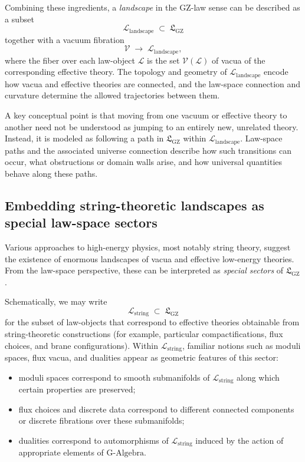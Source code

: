 \documentclass[11pt]{book}
\newcommand{\GAlgebra}{\text{G-Algebra}}
\newcommand{\GZLS}{\ensuremath{\mathfrak{L}_{\mathrm{GZ}}}}
\theoremstyle{plain}
\theoremstyle{definition}
\theoremstyle{remark}
\begin{document}
Combining these ingredients, a \emph{landscape} in the GZ-law sense
can be described as a subset
\[
   \mathcal{L}_{\mathrm{landscape}} \;\subset\; \GZLS
\]
together with a vacuum fibration
\[
   \mathcal{V} \;\longrightarrow\;
   \mathcal{L}_{\mathrm{landscape}},
\]
where the fiber over each law-object $\mathcal{L}$ is the set
$\mathcal{V}(\mathcal{L})$ of vacua of the corresponding effective
theory. The topology and geometry of
$\mathcal{L}_{\mathrm{landscape}}$ encode how vacua and effective
theories are connected, and the law-space connection and curvature
determine the allowed trajectories between them.

A key conceptual point is that moving from one vacuum or effective
theory to another need not be understood as jumping to an entirely
new, unrelated theory. Instead, it is modeled as following a path
in $\GZLS$ within $\mathcal{L}_{\mathrm{landscape}}$. Law-space
paths and the associated universe connection describe how such
transitions can occur, what obstructions or domain walls arise, and
how universal quantities behave along these paths.

\subsection{Embedding string-theoretic landscapes as special law-space sectors}
\label{subsec:string-landscape-sector}


Various approaches to high-energy physics, most notably string
theory, suggest the existence of enormous landscapes of vacua and
effective low-energy theories. From the law-space perspective,
these can be interpreted as \emph{special sectors} of $\GZLS$.

Schematically, we may write
\[
   \mathcal{L}_{\mathrm{string}} \;\subset\; \GZLS
\]
for the subset of law-objects that correspond to effective theories
obtainable from string-theoretic constructions (for example,
particular compactifications, flux choices, and brane configurations).
Within $\mathcal{L}_{\mathrm{string}}$, familiar notions such as
moduli spaces, flux vacua, and dualities appear as geometric
features of this sector:

\begin{itemize}
  \item moduli spaces correspond to smooth submanifolds of
        $\mathcal{L}_{\mathrm{string}}$ along which certain
        properties are preserved;
  \item flux choices and discrete data correspond to different
        connected components or discrete fibrations over these
        submanifolds;
  \item dualities correspond to automorphisms of
        $\mathcal{L}_{\mathrm{string}}$ induced by the action of
        appropriate elements of $\GAlgebra$.
\end{itemize}
\end{document}
